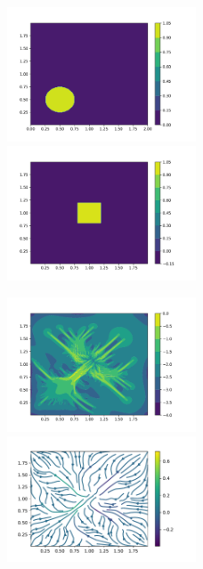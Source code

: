 \documentclass{article}
\theoremstyle{plain}
\theoremstyle{remark}
\theoremstyle{remark}
\theoremstyle{remark}
\numberwithin{equation}{section}
\begin{document}
\begin{figure}
  \includegraphics[width=0.5\textwidth]{5/m1}
  \includegraphics[width=0.5\textwidth]{5/s}
\end{figure}
\begin{figure}
  \includegraphics[width=0.5\textwidth]{5/PCG}
  \includegraphics[width=0.5\textwidth]{5/vector}
\end{figure}
\end{document}
